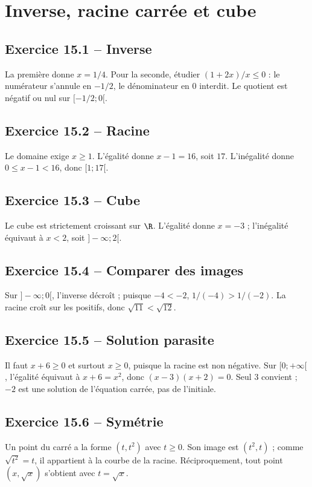 \chapter{Inverse, racine carrée et cube}
\section*{Exercice 15.1 -- Inverse}
La première donne $x=1/4$. Pour la seconde, étudier $(1+2x)/x\leq0$ : le numérateur s'annule en $-1/2$, le dénominateur en $0$ interdit. Le quotient est négatif ou nul sur $[-1/2;0[$.

\section*{Exercice 15.2 -- Racine}
Le domaine exige $x\geq1$. L'égalité donne $x-1=16$, soit $17$. L'inégalité donne $0\leq x-1<16$, donc $[1;17[$.

\section*{Exercice 15.3 -- Cube}
Le cube est strictement croissant sur $\R$. L'égalité donne $x=-3$ ; l'inégalité équivaut à $x<2$, soit $]-\infty;2[$.

\section*{Exercice 15.4 -- Comparer des images}
Sur $]-\infty;0[$, l'inverse décroît ; puisque $-4<-2$, $1/(-4)>1/(-2)$. La racine croît sur les positifs, donc $\sqrt{11}<\sqrt{12}$.

\section*{Exercice 15.5 -- Solution parasite}
Il faut $x+6\geq0$ et surtout $x\geq0$, puisque la racine est non négative. Sur $[0;+\infty[$, l'égalité équivaut à $x+6=x^2$, donc $(x-3)(x+2)=0$. Seul $3$ convient ; $-2$ est une solution de l'équation carrée, pas de l'initiale.

\section*{Exercice 15.6 -- Symétrie}
Un point du carré a la forme $(t,t^2)$ avec $t\geq0$. Son image est $(t^2,t)$ ; comme $\sqrt{t^2}=t$, il appartient à la courbe de la racine. Réciproquement, tout point $(x,\sqrt x)$ s'obtient avec $t=\sqrt x$.
